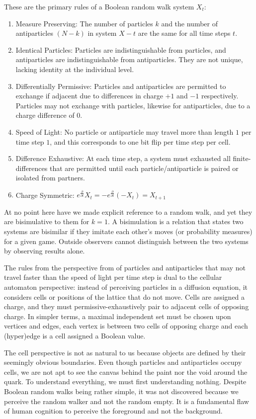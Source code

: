 \documentclass[10pt, a5paper, twoside, openright]{memoir}
\begin{document}
These are the primary rules of a Boolean random walk system $X_t$:
\begin{enumerate}
\item Measure Preserving: The number of particles $k$ and the number of antiparticles $(N-k)$ in system $X-t$ are the same for all time steps $t$.
\item Identical Particles: Particles are indistinguishable from particles, and antiparticles are indistinguishable from antiparticles. They are not unique, lacking identity at the individual level.
\item Differentially Permissive: Particles and antiparticles are permitted to exchange if adjacent due to differences in charge $+1$ and $-1$ respectively. Particles may not exchange with particles, likewise for antiparticles, due to a charge difference of $0$.
\item Speed of Light: No particle or antiparticle may travel more than length $1$ per time step $1$, and this corresponds to one bit flip per time step per cell.
\item Difference Exhaustive: At each time step, a system must exhausted all finite-differences that are permitted until each particle/antiparticle is paired or isolated from partners.
\item Charge Symmetric: $e^{\frac{\partial}{\partial t}} X_t = -e^{\frac{\partial}{\partial t}} (-X_t) = X_{t+1}$
\end{enumerate}
At no point here have we made explicit reference to a random walk, and yet they are bisimulative to them for $k=1$. A bisimulation is a relation that states two systems are bisimilar if they imitate each other's moves (or probability measures) for a given game. Outside observers cannot distinguish between the two systems by observing results alone.

The rules from the perspective from of particles and antiparticles that may not travel faster than the speed of light per time step is dual to the cellular automaton perspective: instead of perceiving particles in a diffusion equation, it considers cells or positions of the lattice that do not move. Cells are assigned a charge, and they must permissive-exhaustively pair to adjacent cells of opposing charge. In simpler terms, a maximal independent set must be chosen upon vertices and edges, each vertex is between two cells of opposing charge and each (hyper)edge is a cell assigned a Boolean value.

The cell perspective is not as natural to us because objects are defined by their seemingly obvious boundaries. Even though particles and antiparticles occupy cells, we are not apt to see the canvas behind the paint nor the void around the quark. To understand everything, we must first understanding nothing. Despite Boolean random walks being rather simple, it was not discovered because we perceive the random walker and not the random empty. It is a fundamental flaw of human cognition to perceive the foreground and not the background.
\end{document}
